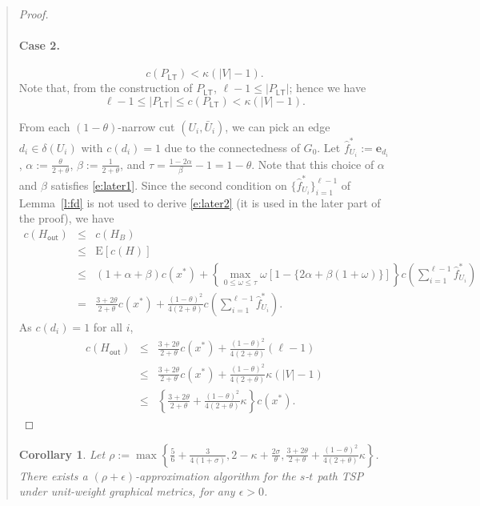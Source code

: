 \documentclass[11pt,letterpaper]{article}
\newtheorem{cor}{Corollary}
\newcommand{\E}{\mathrm{E}}
\newcommand{\st}{\mbox{$s$-$t$} }
\begin{document}
\begin{quote}
\begin{proof}
\paragraph{Case 2.}\begin{equation}\label{e:case2}
c(P_{\mathsf{LT}}) < \kappa (|V|-1)
.\end{equation}Note that, from the construction of $P_{\mathsf{LT}}$, $\ell-1\leq |P_{\mathsf{LT}}|$; hence we have\[
\ell-1\leq |P_{\mathsf{LT}}| \leq c(P_{\mathsf{LT}}) < \kappa (|V|-1)
.\]

From each $(1-\theta)$-narrow cut $(U_i,\bar U_i)$, we can pick an edge $d_i\in\delta(U_i)$ with $c(d_i)=1$ due to the connectedness of $G_0$. Let $\hat f^*_{U_i} := \mathbf{e}_{d_i}$, $\alpha:=\frac{\theta}{2+\theta}$, $\beta:=\frac{1}{2+\theta}$, and $\tau=\frac{1-2\alpha}{\beta}-1=1-\theta$. Note that this choice of $\alpha$ and $\beta$ satisfies \eqref{e:later1}. Since the second condition on $\{\hat f _{U_i}^*\}_{i=1}^{\ell-1}$ of Lemma~\ref{l:fd} is not used to derive \eqref{e:later2} (it is used in the later part of the proof), we have\begin{eqnarray*}
c(H_{\mathsf{out}}) &\leq& c(H_B)\\
&\leq& \E[c(H)]\\
&\leq& (1+\alpha+\beta)c(x^*)+ \left\{\max_{0\leq\omega\leq \tau} \omega\left[1-\{2\alpha+\beta(1+\omega)\}\right] \right\} c\left(\sum_{i=1}^{\ell-1} \hat f ^*_{U_i}\right)\\
&=& \frac{3+2\theta}{2+\theta}c(x^*)+ \frac{(1-\theta)^2}{4(2+\theta)} c\left(\sum_{i=1}^{\ell-1} \hat f ^*_{U_i}\right)
.\end{eqnarray*}As $c(d_i)=1$ for all $i$,\begin{eqnarray*}
c(H_{\mathsf{out}}) &\leq& \frac{3+2\theta}{2+\theta}c(x^*)+ \frac{(1-\theta)^2}{4(2+\theta)} (\ell -1)\\
&\leq& \frac{3+2\theta}{2+\theta}c(x^*)+ \frac{(1-\theta)^2}{4(2+\theta)} \kappa (|V|-1)\\
&\leq& \left\{ \frac{3+2\theta}{2+\theta} + \frac{(1-\theta)^2}{4(2+\theta)} \kappa \right\} c(x^*)
.\end{eqnarray*}
\end{proof}

\begin{cor}\label{c:unitgar}
Let $\rho:=\max\left\{
\frac{5}{6}+\frac{3}{4(1+\sigma)},
2-\kappa+\frac{2\sigma}{\theta},
\frac{3+2\theta}{2+\theta} + \frac{(1-\theta)^2}{4(2+\theta)} \kappa
\right\}$. There exists a $(\rho+\epsilon)$-ap\-proxi\-ma\-tion algorithm for the \st path TSP under unit-weight graphical metrics, for any $\epsilon>0$.
\end{cor}


\end{quote}
\end{document}
